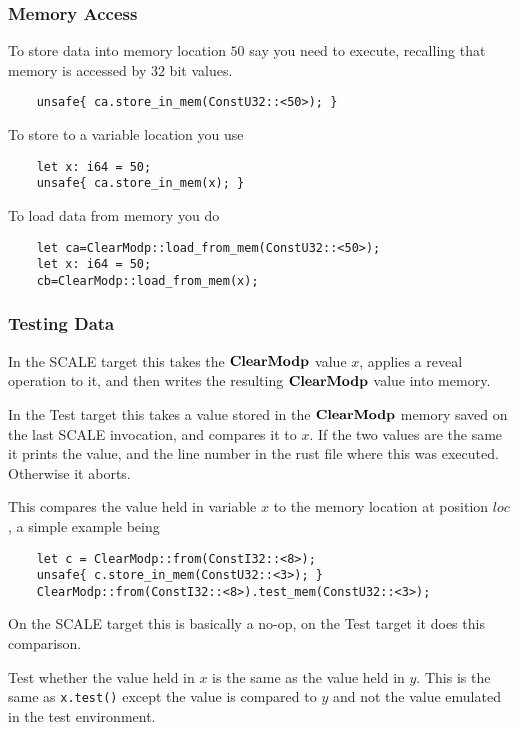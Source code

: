 \subsubsection{Memory Access}
To store data into memory location $50$ say you need to execute,
recalling that memory is accessed by $32$ bit values.
\begin{lstlisting}
    unsafe{ ca.store_in_mem(ConstU32::<50>); }
\end{lstlisting}
To store to a variable location you use
\begin{lstlisting}
    let x: i64 = 50;
    unsafe{ ca.store_in_mem(x); }
\end{lstlisting}

To load data from memory you do
\begin{lstlisting}
    let ca=ClearModp::load_from_mem(ConstU32::<50>);
    let x: i64 = 50;
    cb=ClearModp::load_from_mem(x);
\end{lstlisting}


\subsubsection{Testing Data}
In the SCALE target this takes the $\mathbf{ClearModp}$ value $x$,
applies a reveal operation to it, and then writes the
resulting $\mathbf{ClearModp}$ value into memory.

In the Test target this takes a value stored in the $\mathbf{ClearModp}$
memory saved on the last SCALE invocation, and compares it to
$x$. If the two values are the same it prints the value, and the
line number in the rust file where this was executed.
Otherwise it aborts.

This compares the value held in variable $x$ to the memory location
at position $loc$, a simple example being
\begin{lstlisting}
    let c = ClearModp::from(ConstI32::<8>);
    unsafe{ c.store_in_mem(ConstU32::<3>); }
    ClearModp::from(ConstI32::<8>).test_mem(ConstU32::<3>);
\end{lstlisting}
On the SCALE target this is basically a no-op, on the Test target
it does this comparison.

Test whether the value held in $x$ is the same as the value held in $y$.
This is the same as \verb|x.test()| except the value is compared to
$y$ and not the value emulated in the test environment.
